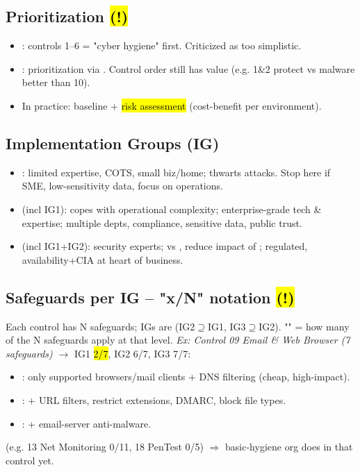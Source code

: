 \subsection{Prioritization \hl{(!)}}
\begin{itemize}
\item {}: controls 1--6 = "cyber hygiene" first. Criticized as too simplistic.
\item {}: prioritization via . Control order still has value (e.g. 1\&2 protect vs malware better than 10).
\item In practice: baseline + \hl{risk assessment} (cost-benefit per environment).
\end{itemize}

\subsection{Implementation Groups (IG)}
\begin{itemize}
\item {}: limited expertise, COTS, small biz/home; thwarts  attacks. Stop here if SME, low-sensitivity data, focus on operations.
\item {} (incl IG1): copes with operational complexity; enterprise-grade tech \& expertise; multiple depts, compliance, sensitive data, public trust.
\item {} (incl IG1+IG2): security experts; vs , reduce impact of ; regulated, availability+CIA at heart of business.
\end{itemize}

\subsection{Safeguards per IG -- "x/N" notation \hl{(!)}}
Each control has N safeguards; IGs are  (IG2$\supseteq$IG1, IG3$\supseteq$IG2). "" = how many of the N safeguards apply at that level.
\textit{Ex: Control 09 Email \& Web Browser (7 safeguards)} $\to$ IG1 \hl{2/7}, IG2 6/7, IG3 7/7:
\begin{itemize}
\item {}: only supported browsers/mail clients + DNS filtering (cheap, high-impact).
\item {}: + URL filters, restrict extensions, DMARC, block file types.
\item {}: + email-server anti-malware.
\end{itemize}
 (e.g. 13 Net Monitoring 0/11, 18 PenTest 0/5) $\Rightarrow$ basic-hygiene org does  in that control yet.

